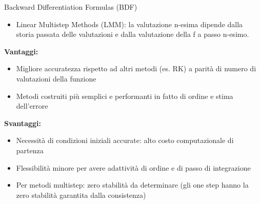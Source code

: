 \documentclass[aspectratio=169, 10pt, handout,usenames,dvipsnames]{beamer}
\begin{document}
    \begin{frame}{Backward Differentiation Formulas (BDF)}
        \begin{itemize}
            \item Linear Multistep Methods (LMM): la valutazione n-esima dipende dalla storia passata delle valutazioni e dalla valutazione della f a passo n-esimo.
            \end{itemize}
            \textbf{Vantaggi:}
        \begin{itemize}
            \item Migliore accuratezza rispetto ad altri metodi (es. RK) a parità di numero di valutazioni della funzione
            \item Metodi costruiti più semplici e performanti in fatto di ordine e stima dell’errore 
        \end{itemize}
        \textbf{Svantaggi:}
        \begin{itemize}
            \item Necessità di condizioni iniziali accurate: alto costo computazionale di partenza 
            \item Flessibilità minore per avere adattività di ordine e di passo di integrazione
            \item Per metodi multistep: zero stabilità da determinare (gli one step hanno la zero stabilità garantita dalla consistenza)
        \end{itemize}
            
            
            
            
    \end{frame}
\end{document}
